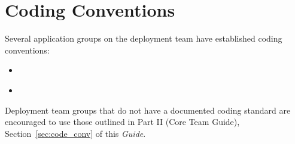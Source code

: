 
\section{Coding Conventions}
\label{sec:app_code_conv}

Several application groups on the deployment team have established coding 
conventions:
\begin{itemize}
\item {}\cite{FMSdevguide}
\item {}\cite{CCSMdevguide}
\end{itemize}

Deployment team groups that do not have a documented coding standard are
encouraged to use those outlined in Part II (Core Team Guide), 
Section~\ref{sec:code_conv} of this {\it Guide}. 




